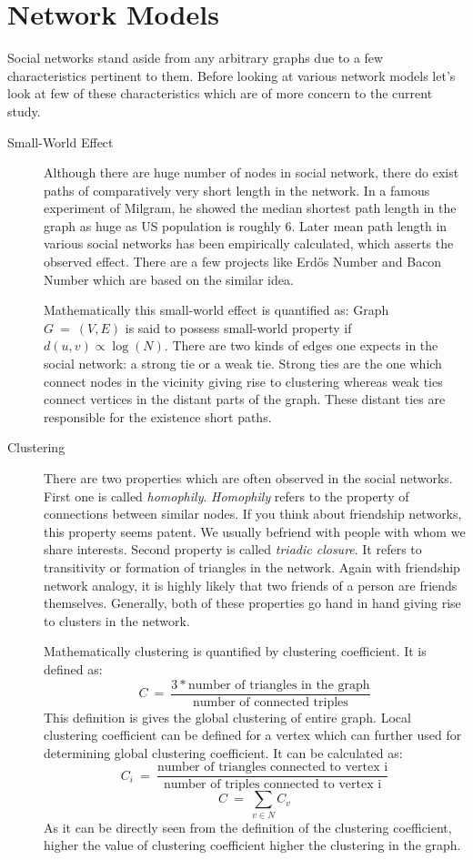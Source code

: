 \documentclass[12pt]{article}
\begin{document}
\section{Network Models}
Social networks stand aside from any arbitrary graphs due to a few characteristics pertinent to them. Before looking at various network models let's look at few of these characteristics which are of more concern to the current study.
\begin{description}
	\item [Small-World Effect]
	\par Although there are huge number of nodes in social network, there do exist paths of comparatively very short length in the network. In a famous experiment of Milgram\cite{milgram}, he showed the median shortest path length in the graph as huge as US population is roughly 6. Later mean path length in various social networks has been empirically calculated, which asserts the observed effect\cite{newmann}. There are a few projects like Erd\H{o}s Number and Bacon Number which are based on the similar idea.
	\par Mathematically this small-world effect is quantified as: Graph $G ~=~ (V, E)$ is said to possess small-world property if $d(u, v) \propto \log(N)$. There are  two kinds of edges one expects in the social network: a strong tie or a weak tie. Strong ties are the one which connect nodes in the vicinity giving rise to clustering  whereas weak ties connect vertices in the distant parts of the graph. These distant ties are responsible for the existence short paths.

	\item [Clustering]
	\par There are two properties which are often observed in the social networks. First one is called {\it homophily}. {\it Homophily} refers to the property of connections between similar nodes. If you think about friendship networks, this property seems patent. We usually befriend with people with whom we share interests. Second property is called {\it triadic closure}. It refers to transitivity or formation of triangles in the network. Again with friendship network analogy, it is highly likely that two friends of a person are friends themselves. Generally, both of these properties go hand in hand giving rise to clusters in the network.
	\par Mathematically clustering is quantified by clustering coefficient. It is defined as:
	\[
		C~=~ \frac {3 * \textrm{number of triangles in the graph}} {\textrm{number of connected triples}}
	\]
	This definition is gives the global clustering of entire graph. Local clustering coefficient\cite{watts} can be defined for a vertex which can further used for determining global clustering coefficient. It can be calculated as:
	\[
		C_i~=~ \frac {\textrm{number of triangles connected to vertex i}} {\textrm{number of triples connected to vertex i}}
	\]
	\[
		C ~=~ \sum_{v \in N}{C_v}
	\]
	As it can be directly seen from the definition of the clustering coefficient, higher the value of clustering coefficient higher the clustering in the graph.


\end{description}
\end{document}
